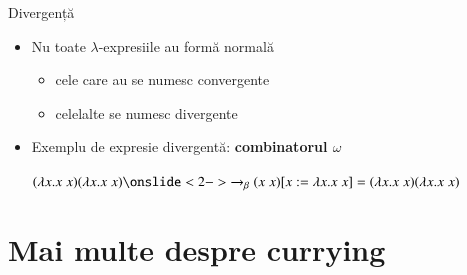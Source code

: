 \documentclass[xcolor=pdftex,romanian,colorlinks]{beamer}
\begin{document}
\begin{frame}{Divergență}
\protect\hypertarget{divergenux21bux103}{}

\begin{itemize}
\item
  Nu toate \(\lambda\)-expresiile au formă normală

  \begin{itemize}
  
  \item
    cele care au se numesc convergente
  \item
    celelalte se numesc divergente
  \end{itemize}
\item
  Exemplu de expresie divergentă: \textbf{combinatorul \(\omega\)}

  \((\lambda x. x\; x) (\lambda x. x\; x) \onslide<2->{\rightarrow_\beta (x\; x)[x := \lambda x. x\; x] = (\lambda x. x\; x) (\lambda x. x\; x)}\)
\end{itemize}

\end{frame}

\section{Mai multe despre currying}
\end{document}

